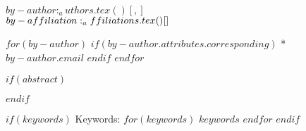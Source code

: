\begin{flushleft}
{\LARGE
\textbf{}
}
\newline

\vspace{12pt}

$by-author:_authors.tex()[, ]$
\\
\bigskip
$by-affiliation:_affiliations.tex()[\\ ]$
\newline

$for(by-author)$
$if(by-author.attributes.corresponding)$
* $by-author.email$
$endif$
$endfor$

\end{flushleft}

\linenumbers

$if(abstract)$
\begin{abstract}
$abstract$
\end{abstract}
$endif$

$if(keywords)$
Keywords: $for(keywords)$ $keywords$ $endfor$
$endif$
